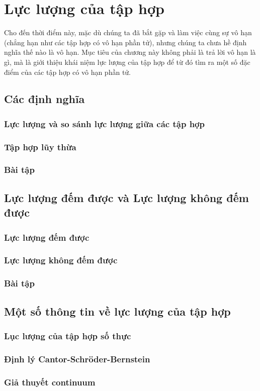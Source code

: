 \chapter{Lực lượng của tập hợp}\label{chapter:cardinality}

Cho đến thời điểm này, mặc dù chúng ta đã bắt gặp và làm việc cùng sự vô hạn (chẳng hạn như các tập hợp có vô hạn phần tử), nhưng chúng ta chưa hề định nghĩa thế nào là vô hạn. Mục tiêu của chương này không phải là trả lời vô hạn là gì, mà là giới thiệu khái niệm lực lượng của tập hợp để từ đó tìm ra một số đặc điểm của các tập hợp có vô hạn phần tử.

\section{Các định nghĩa}

\subsection{Lực lượng và so sánh lực lượng giữa các tập hợp}

\subsection{Tập hợp lũy thừa}

\subsection{Bài tập}

\section{Lực lượng đếm được và Lực lượng không đếm được}

\subsection{Lực lượng đếm được}

\subsection{Lực lượng không đếm được}

\subsection{Bài tập}

\section{Một số thông tin về lực lượng của tập hợp}

\subsection{Lục lượng của tập hợp số thực}

\subsection{Định lý Cantor-Schr\"{o}der-Bernstein}

\subsection{Giả thuyết continuum}
